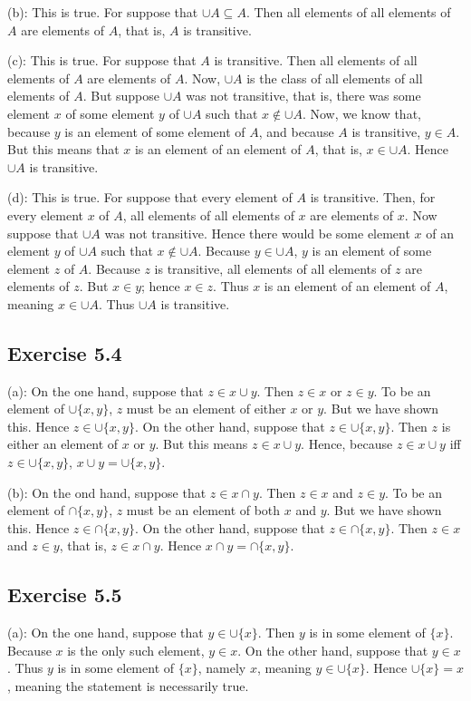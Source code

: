 \documentclass{article}
\theoremstyle{definition}
\begin{document}
(b): This is true. For suppose that $\cup A\subseteq A$. Then all elements of all elements of $A$ are elements of $A$, that is, $A$ is transitive.


(c): This is true. For suppose that $A$ is transitive. Then all elements of all elements of $A$ are elements of $A$. Now, $\cup A$ is the class of all elements of 
all elements of $A$. But suppose $\cup A$ was not transitive, that is, there was some element $x$ of some element $y$ of $\cup A$ such that $x\notin \cup A$. Now, we know that, 
because $y$ is an element of some element of $A$, and because $A$ is transitive, $y\in A$. But this means that $x$ is an element of an element of $A$, that is, 
$x\in\cup A$. Hence $\cup A$ is transitive. 


(d): This is true. For suppose that every element of $A$ is transitive. Then, for every element $x$ of $A$, all elements of all elements of $x$ are elements of $x$. 
Now suppose that $\cup A$ was not transitive. Hence there would be some element $x$ of an element $y$ of $\cup A$ such that $x\notin\cup A$. Because $y\in\cup A$, 
$y$ is an element of some element $z$ of $A$. Because $z$ is transitive, all elements of all elements of $z$ are elements of $z$. But $x\in y$; hence $x\in z$. Thus 
$x$ is an element of an element of $A$, meaning $x\in\cup A$. Thus $\cup A$ is transitive. 

\subsection*{Exercise 5.4}
(a): On the one hand, suppose that $z\in x\cup y$. Then $z\in x$ or $z\in y$. To be an element of $\cup\{x,y\}$, $z$ must be an element of either $x$ or $y$. But we have 
shown this. Hence $z\in\cup\{x,y\}$. On the other hand, suppose that $z\in\cup\{x,y\}$. Then $z$ is either an element of $x$ or $y$. But this means $z\in x\cup y$. Hence, 
because $z\in x\cup y$ iff $z\in\cup\{x,y\}$, $x\cup y=\cup\{x,y\}$.


(b): On the ond hand, suppose that $z\in x\cap y$. Then $z\in x$ and $z\in y$. To be an element of $\cap\{x,y\}$, $z$ must be an element of both $x$ and $y$. But we have shown 
this. Hence $z\in\cap\{x,y\}$. On the other hand, suppose that $z\in\cap\{x,y\}$. Then $z\in x$ and $z\in y$, that is, $z\in x\cap y$. Hence 
$x\cap y=\cap\{ x,y\}$.

\subsection*{Exercise 5.5}
(a): On the one hand, suppose that $y\in\cup\{x\}$. Then $y$ is in some element of $\{x\}$. Because $x$ is the only such element, $y\in x$. On the other hand, suppose that 
$y\in x$. Thus $y$ is in some element of $\{x\}$, namely $x$, meaning $y\in\cup\{x\}$. Hence $\cup\{x\}=x$, meaning the statement is necessarily true.
\end{document}
